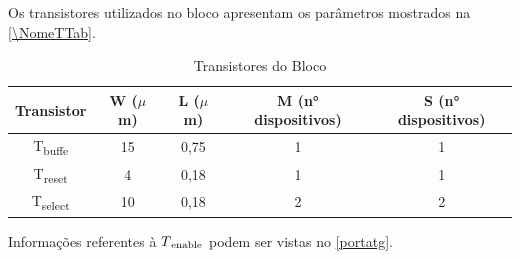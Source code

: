 Os transistores utilizados no bloco apresentam os par\^ametros mostrados na \autoref{\NomeTTab}.


\begin{table}[!h]
\caption{Transistores do Bloco \NomeBloco}
\label{\NomeTTab}
\centering
\begin{tabular}{ccccc}
\toprule
Transistor & W ($\mu$m)  & L ($\mu$m)           & M (n° dispositivos) & S (n° dispositivos)\\
\midrule \midrule
T\textsubscript{buffe} & 15 & 0,75 & 1 & 1\\
\midrule
T\textsubscript{reset} & 4 & 0,18 & 1 & 1\\
\midrule
T\textsubscript{select} & 10 & 0,18 & 2 & 2\\
\bottomrule
\end{tabular}
\end{table}

Informações referentes à $T\textsubscript{enable}$ podem ser vistas no \autoref{portatg}.